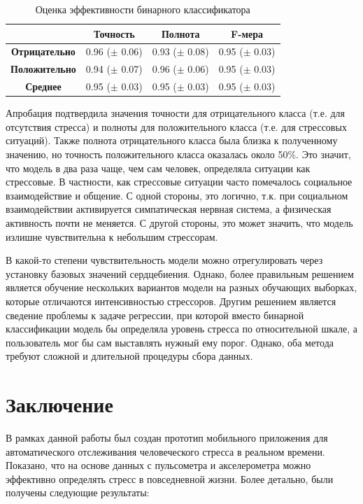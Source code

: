 \documentclass[14pt]{matmex-diploma-custom}
\begin{document}
\begin{table}[ht]
  \centering
  \begin{tabular}{|c|c|c|c|}
    \hline
    & \textbf{Точность} & \textbf{Полнота} & \textbf{F-мера} \\ \hline
    \textbf{Отрицательно} & 0.96 ($\pm$ 0.06) & 0.93 ($\pm$ 0.08) & 0.95 ($\pm$ 0.03) \\ \hline
    \textbf{Положительно} & 0.94 ($\pm$ 0.07) & 0.96 ($\pm$ 0.06) & 0.95 ($\pm$ 0.03) \\ \hline
    \textbf{Среднее} & 0.95 ($\pm$ 0.03) & 0.95 ($\pm$ 0.03) & 0.95 ($\pm$ 0.03) \\ \hline
  \end{tabular}
  \caption{Оценка эффективности бинарного классификатора}
  \label{table:performance}
\end{table}

Апробация подтвердила значения точности для отрицательного класса (т.е. для
отсутствия стресса) и полноты для положительного класса (т.е. для стрессовых
ситуаций). Также полнота отрицательного класса была близка к полученному
значению, но точность положительного класса оказалась около 50\%. Это значит,
что модель в два раза чаще, чем сам человек, определяла ситуации как стрессовые.
В частности, как стрессовые ситуации часто помечалось социальное взаимодействие
и общение. С одной стороны, это логично, т.к. при социальном взаимодействии
активируется симпатическая нервная система, а физическая активность почти не
меняется. С другой стороны, это может значить, что модель излишне чувствительна
к небольшим стрессорам.

В какой-то степени чувствительность модели можно отрегулировать через установку
базовых значений сердцебиения. Однако, более правильным решением является
обучение нескольких вариантов модели на разных обучающих выборках, которые
отличаются интенсивностью стрессоров. Другим решением является сведение проблемы
к задаче регрессии, при которой вместо бинарной классификации модель бы
определяла уровень стресса по относительной шкале, а пользователь мог бы сам
выставлять нужный ему порог. Однако, оба метода требуют сложной и длительной
процедуры сбора данных.

\section*{Заключение}
В рамках данной работы был создан прототип мобильного приложения для
автоматического отслеживания человеческого стресса в реальном времени. Показано,
что на основе данных с пульсометра и акселерометра можно эффективно определять
стресс в повседневной жизни. Более детально, были получены следующие результаты:
\end{document}

